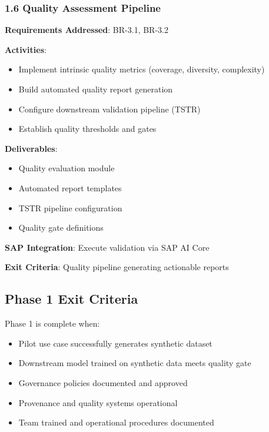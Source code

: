 \documentclass[12pt,a4paper,twoside]{report}
\begin{document}
\subsubsection{1.6 Quality Assessment Pipeline}

\begin{tcolorbox}[colback=blue!5,colframe=blue!70,title=1.6 Quality Evaluation]
\textbf{Requirements Addressed}: BR-3.1, BR-3.2

\textbf{Activities}:
\begin{itemize}
\item Implement intrinsic quality metrics (coverage, diversity, complexity)
\item Build automated quality report generation
\item Configure downstream validation pipeline (TSTR)
\item Establish quality thresholds and gates
\end{itemize}

\textbf{Deliverables}:
\begin{itemize}
\item Quality evaluation module
\item Automated report templates
\item TSTR pipeline configuration
\item Quality gate definitions
\end{itemize}

\textbf{SAP Integration}: Execute validation via SAP AI Core

\textbf{Exit Criteria}: Quality pipeline generating actionable reports
\end{tcolorbox}

\subsection{Phase 1 Exit Criteria}

Phase 1 is complete when:
\begin{itemize}
\item[\checkmark] Pilot use case successfully generates synthetic dataset
\item[\checkmark] Downstream model trained on synthetic data meets quality gate
\item[\checkmark] Governance policies documented and approved
\item[\checkmark] Provenance and quality systems operational
\item[\checkmark] Team trained and operational procedures documented
\end{itemize}
\end{document}
